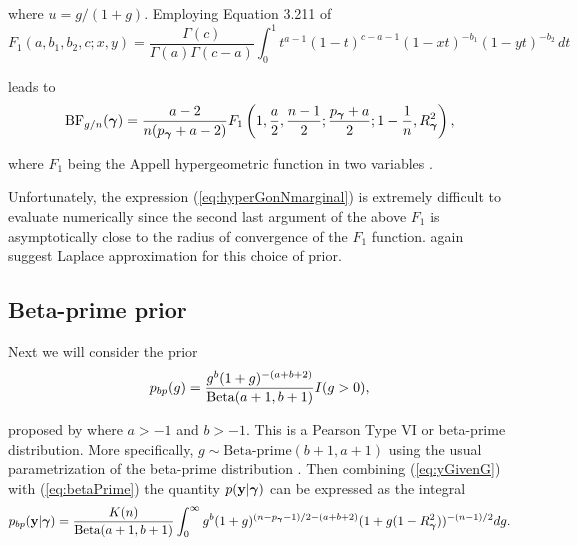 \noindent where $u=g/(1+g)$. Employing 
Equation 3.211 of \cite{Gradshteyn2007} 
$$
F_1(a,b_1,b_2,c; x,y) = \frac{\Gamma(c)} {\Gamma(a)\Gamma(c-a)} 
\int_0^1 t^{a-1} (1-t)^{c-a-1} (1-xt)^{-b_1} (1-yt)^{-b_2} \, dt
$$

\noindent 
leads to
\begin{equation}\label{eq:hyperGonNmarginal}
\displaystyle \mbox{BF}_{g/n}({\boldsymbol \gamma}) =  \frac{a - 2}{n(p_{\boldsymbol \gamma} + a - 2)} F_1\left( 1, \frac{a}{2}, \frac{n-1}{2}; \frac{p_{\boldsymbol \gamma} + a}{2}; 1  -  \frac{1}{n}, R_{\boldsymbol \gamma}^2 \right),
\end{equation}

\noindent where
$F_1$ being the Appell hypergeometric function in two variables 
\cite{Weisstein2009}. 






Unfortunately, the expression (\ref{eq:hyperGonNmarginal}) is extremely
difficult to evaluate numerically since the second last argument of the above 
$F_1$ is asymptotically close to the radius of convergence of the $F_1$
function.
\cite{Liang2008} again suggest Laplace approximation 
for this choice of prior. 

 
\subsection{Beta-prime prior} 
 
Next we will consider the prior 
\begin{equation}\label{eq:betaPrime}
\displaystyle p_{bp}(g) = \frac{g^{b}(1 + g)^{-(a+b+2)}}{\mbox{Beta}(a+1,b+1)} I(g>0),
\end{equation}

\noindent proposed by \cite{Maruyama2011} where $a>-1$ and $b>-1$. 
This is a Pearson Type VI or beta-prime distribution. More specifically, 
$g\sim \mbox{Beta-prime}(b+1,a+1)$ using the usual parametrization of 
the beta-prime distribution \citep{Johnson1995}.
Then combining (\ref{eq:yGivenG}) with (\ref{eq:betaPrime}) the quantity $p({\bf y}|{\boldsymbol \gamma})$ 
can be expressed as the integral
$$
\displaystyle p_{bp}({\bf y}|{\boldsymbol \gamma}) 
=
\frac{K(n)}{\mbox{Beta}(a+1,b+1)}
\int_0^\infty             
g^{b}(1 + g)^{(n - p_{\boldsymbol \gamma} - 1)/2 - (a + b + 2)}  (1 + g (1-R_{\boldsymbol \gamma}^2) )^{-(n-1)/2}  
dg.
$$

